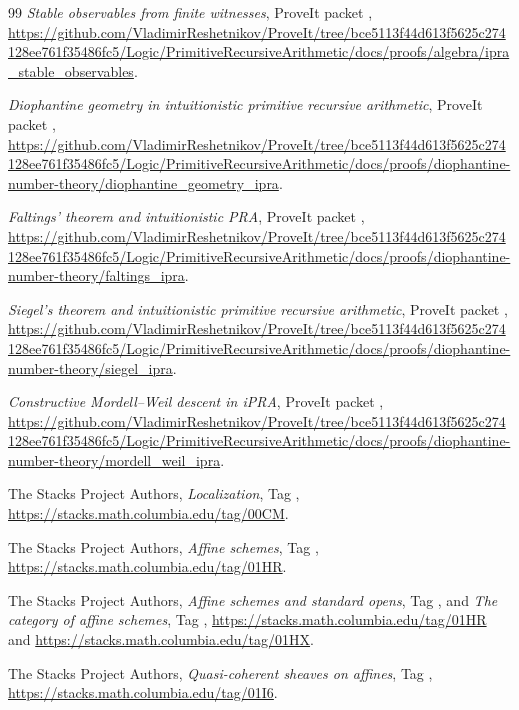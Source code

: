 \begin{thebibliography}{99}
\emph{Stable observables from finite witnesses},
ProveIt packet ,
\url{https://github.com/VladimirReshetnikov/ProveIt/tree/bce5113f44d613f5625c274128ee761f35486fc5/Logic/PrimitiveRecursiveArithmetic/docs/proofs/algebra/ipra_stable_observables}.

\emph{Diophantine geometry in intuitionistic primitive recursive arithmetic},
ProveIt packet ,
\url{https://github.com/VladimirReshetnikov/ProveIt/tree/bce5113f44d613f5625c274128ee761f35486fc5/Logic/PrimitiveRecursiveArithmetic/docs/proofs/diophantine-number-theory/diophantine_geometry_ipra}.

\emph{Faltings' theorem and intuitionistic PRA},
ProveIt packet ,
\url{https://github.com/VladimirReshetnikov/ProveIt/tree/bce5113f44d613f5625c274128ee761f35486fc5/Logic/PrimitiveRecursiveArithmetic/docs/proofs/diophantine-number-theory/faltings_ipra}.

\emph{Siegel's theorem and intuitionistic primitive recursive arithmetic},
ProveIt packet ,
\url{https://github.com/VladimirReshetnikov/ProveIt/tree/bce5113f44d613f5625c274128ee761f35486fc5/Logic/PrimitiveRecursiveArithmetic/docs/proofs/diophantine-number-theory/siegel_ipra}.

\emph{Constructive Mordell--Weil descent in iPRA},
ProveIt packet ,
\url{https://github.com/VladimirReshetnikov/ProveIt/tree/bce5113f44d613f5625c274128ee761f35486fc5/Logic/PrimitiveRecursiveArithmetic/docs/proofs/diophantine-number-theory/mordell_weil_ipra}.

The Stacks Project Authors,
\emph{Localization}, Tag ,
\url{https://stacks.math.columbia.edu/tag/00CM}.

The Stacks Project Authors,
\emph{Affine schemes}, Tag ,
\url{https://stacks.math.columbia.edu/tag/01HR}.

The Stacks Project Authors,
\emph{Affine schemes and standard opens}, Tag , and
\emph{The category of affine schemes}, Tag ,
\url{https://stacks.math.columbia.edu/tag/01HR} and
\url{https://stacks.math.columbia.edu/tag/01HX}.

The Stacks Project Authors,
\emph{Quasi-coherent sheaves on affines}, Tag ,
\url{https://stacks.math.columbia.edu/tag/01I6}.


\end{thebibliography}

